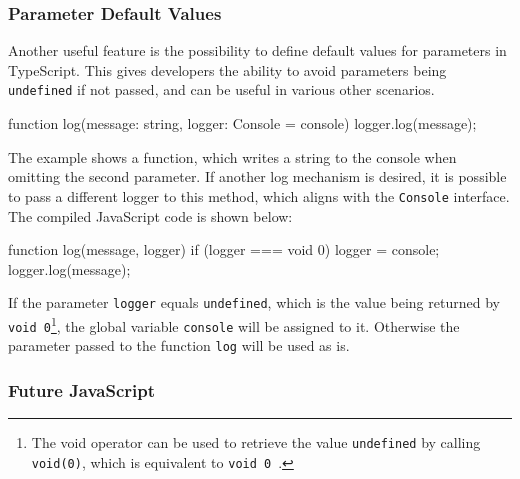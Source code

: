 \subsubsection{Parameter Default Values}
\label{sec:ts-parameter-default-values}

Another useful feature is the possibility to define default values for parameters in TypeScript. This gives developers the ability to avoid parameters being \texttt{undefined} if not passed, and can be useful in various other scenarios.
\begin{JsCode}[numbers=none]
function log(message: string, logger: Console = console) {
  logger.log(message);
}
\end{JsCode}
The example shows a function, which writes a string to the console when omitting the second parameter. If another log mechanism is desired, it is possible to pass a different logger to this method, which aligns with the \texttt{Console} interface. The compiled JavaScript code is shown below:
\begin{JsCode}[numbers=none]
function log(message, logger) {
    if (logger === void 0) { logger = console; }
    logger.log(message);
}
\end{JsCode}
If the parameter \texttt{logger} equals \texttt{undefined}, which is the value being returned by \texttt{void 0}\footnote{The void operator can be used to retrieve the value \texttt{undefined} by calling \texttt{void(0)}, which is equivalent to \texttt{void 0}~\cite{void:MDN:2017}.}, the global variable \texttt{console} will be assigned to it. Otherwise the parameter passed to the function \texttt{log} will be used as is.


\subsubsection{Future JavaScript}
\label{sec:ts-future-javascript}

